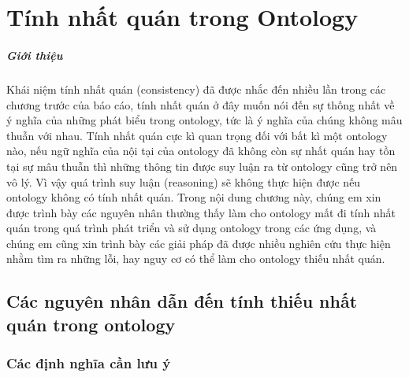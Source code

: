 \chapter{Tính nhất quán trong Ontology}
\paragraph{Giới thiệu} Khái niệm tính nhất quán (consistency) đã được nhắc đến nhiều lần trong các chương trước của báo cáo, tính nhất quán ở đây muốn nói đến sự thống nhất về ý nghĩa của những phát biểu trong ontology, tức là ý nghĩa của chúng không mâu thuẫn với nhau. Tính nhất quán cực kì quan trọng đối với bất kì một ontology nào, nếu ngữ nghĩa của nội tại của ontology đã không còn sự nhất quán hay tồn tại sự mâu thuẫn thì những thông tin được suy luận ra từ ontology cũng trở nên vô lý. Vì vậy quá trình suy luận (reasoning) sẽ không thực hiện được nếu ontology không có tính nhất quán. Trong nội dung chương này, chúng em xin được trình bày các nguyên nhân thường thấy làm cho ontology mất đi tính nhất quán trong quá trình phát triển và sử dụng ontology trong các ứng dụng, và chúng em cũng xin trình bày các giải pháp đã được nhiều nghiên cứu thực hiện nhằm tìm ra những lỗi, hay nguy cơ có thể làm cho ontology thiếu nhất quán.
\clearpage
\section{Các nguyên nhân dẫn đến tính thiếu nhất quán trong ontology}
\subsection{Các định nghĩa cần lưu ý \cite{satisfy}}
